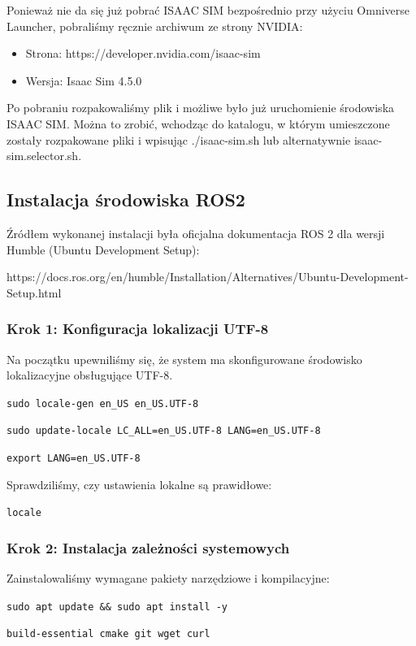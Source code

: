 \documentclass[12pt]{article}
\begin{document}
Ponieważ nie da się już pobrać ISAAC SIM bezpośrednio przy użyciu Omniverse Launcher, pobraliśmy ręcznie archiwum ze strony NVIDIA:

\begin{itemize}
    \item Strona: https://developer.nvidia.com/isaac-sim
    \item Wersja: Isaac Sim 4.5.0
\end{itemize}

\noindent Po pobraniu rozpakowaliśmy plik i możliwe było już uruchomienie środowiska ISAAC SIM. Można to zrobić, wchodząc do katalogu, w którym umieszczone zostały rozpakowane pliki i wpisując ./isaac-sim.sh lub alternatywnie isaac-sim.selector.sh.

 

\subsection{Instalacja środowiska ROS2}

Źródłem wykonanej instalacji była oficjalna dokumentacja ROS 2 dla wersji Humble (Ubuntu Development Setup):

 https://docs.ros.org/en/humble/Installation/Alternatives/Ubuntu-Development-Setup.html


\subsubsection{Krok 1: Konfiguracja lokalizacji UTF-8}
Na początku upewniliśmy się, że system ma skonfigurowane środowisko lokalizacyjne obsługujące UTF-8.


\texttt{sudo locale-gen en\_US en\_US.UTF-8}

\texttt{sudo update-locale LC\_ALL=en\_US.UTF-8 LANG=en\_US.UTF-8}

\texttt{export LANG=en\_US.UTF-8}

\noindent Sprawdziliśmy, czy ustawienia lokalne są prawidłowe:

\texttt{locale}

\subsubsection{Krok 2: Instalacja zależności systemowych}
Zainstalowaliśmy wymagane pakiety narzędziowe i kompilacyjne:

\texttt{sudo apt update \&\& sudo apt install -y}


\texttt{build-essential cmake git wget curl}
\end{document}
